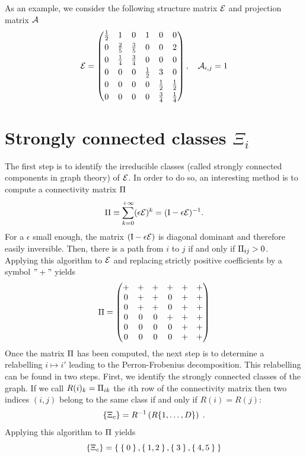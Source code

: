 \documentclass{article}
\begin{document}
 
As an example, we consider the following structure matrix $\mathcal{E}$ and projection matrix $\mathcal{A}$
%
\begin{equation}
\mathcal{E} = \begin{pmatrix}
\frac{1}{2}& 1& 0& 1& 0& 0\\[0.1cm]
0& \frac{2}{5}& \frac{3}{5}& 0& 0& 2\\[0.1cm]
0& \frac{1}{4}& \frac{3}{4}& 0& 0& 0\\[0.1cm]
0& 0& 0& \frac{1}{2}& 3& 0\\[0.1cm]
0& 0& 0& 0& \frac{1}{2}& \frac{1}{2}\\[0.1cm]
0& 0& 0& 0& \frac{3}{4}& \frac{1}{4}
\end{pmatrix}, \quad \mathcal{A}_{i,j} = 1   
\end{equation}

 
\section{Strongly connected classes $\Xi_i$}
The first step is to identify the irreducible classes (called strongly connected components in graph theory) of $\mathcal{E}$.
In order to do so, an interesting method is to compute a connectivity matrix $\Pi$
\begin{equation} 
\Pi \equiv \sum_{k=0}^{+\infty} (\epsilon\mathcal{E})^k = (\mathrm I- \epsilon\mathcal{E} )^{-1} .
\end{equation}
For a $\epsilon$ small enough, the matrix $(\mathrm I- \epsilon \mathcal{E} )$ is diagonal dominant
and therefore easily inversible.
Then, there is a path from $i$ to $j$ if and only if $ \Pi_{ij} >0$.
Applying this algorithm to $\mathcal{E}$ and replacing strictly positive coefficients by a symbol $"+"$ yields 
\begin{equation}
%
\ex\Conn = \begin{pmatrix}
+& +& +& +& +& +\\
0& +& +& 0& +& +\\
0& +& +& 0& +& +\\
0& 0& 0& +& +& +\\
0& 0& 0& 0& +& +\\
0& 0& 0& 0& +& +
\end{pmatrix} 
\end{equation}
Once the matrix $\Pi$ has been computed, the next step is to determine a relabelling $i \mapsto i'$
leading to the Perron-Frobenius decomposition.
This relabelling can be found in two steps. First, we identify the strongly connected classes of the graph.
If we call $R(i)_k = \Pi_{ik}$ the $i$th row of the connectivity matrix then two indices $(i,j)$ belong to
the same class if and only if $R(i)=R(j)$:
\begin{equation}
 \{ \Xi_{c} \} =  R^{-1}\left( R \{ 1, \dots, D \} \right) \;.
\end{equation}
Applying this algorithm to $\Pi$ yields
% 
\begin{equation} %
\{ \ex{\sC{c}} \} =  \Set{\Set{0},\Set{1,2},\Set{3},\Set{4,5}} 
\end{equation}
\end{document}
